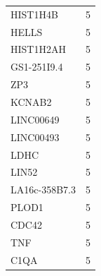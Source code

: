 \documentclass[a4paper,12pt]{article}
\begin{document}
\begin{longtable}{ll}
  HIST1H4B      & 5                                                                                     \\
  HELLS         & 5                                                                                     \\
  HIST1H2AH     & 5                                                                                     \\
  GS1-251I9.4   & 5                                                                                     \\
  ZP3           & 5                                                                                     \\
  KCNAB2        & 5                                                                                     \\
  LINC00649     & 5                                                                                     \\
  LINC00493     & 5                                                                                     \\
  LDHC          & 5                                                                                     \\
  LIN52         & 5                                                                                     \\
  LA16c-358B7.3 & 5                                                                                     \\
  PLOD1         & 5                                                                                     \\
  CDC42         & 5                                                                                     \\
  TNF           & 5                                                                                     \\
  C1QA          & 5                                                                                     \\
\end{longtable}
\end{document}
